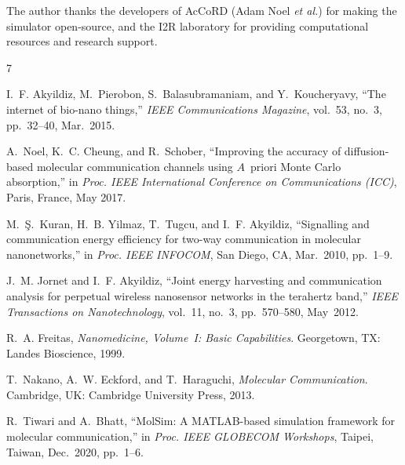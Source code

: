 \documentclass[journal]{IEEEtran}
\begin{document}
The author thanks the developers of AcCoRD (Adam Noel \emph{et al.}) for
making the simulator open-source, and the I2R laboratory for providing
computational resources and research support.

\ifCLASSOPTIONcaptionsoff
  \newpage
\fi

\begin{thebibliography}{7}

I.~F. Akyildiz, M.~Pierobon, S.~Balasubramaniam, and Y.~Koucheryavy,
``The internet of bio-nano things,''
\emph{IEEE Communications Magazine}, vol.~53, no.~3, pp.~32--40, Mar.~2015.

A.~Noel, K.~C. Cheung, and R.~Schober,
``Improving the accuracy of diffusion-based molecular communication channels
using ${A}$~priori Monte Carlo absorption,''
in \emph{Proc. IEEE International Conference on Communications (ICC)}, Paris,
France, May 2017.

M.~\c{S}.~Kuran, H.~B. Yilmaz, T.~Tugcu, and I.~F. Akyildiz,
``Signalling and communication energy efficiency for two-way communication in
molecular nanonetworks,''
in \emph{Proc. IEEE INFOCOM}, San Diego, CA, Mar.~2010, pp.~1--9.

J.~M. Jornet and I.~F. Akyildiz,
``Joint energy harvesting and communication analysis for perpetual wireless
nanosensor networks in the terahertz band,''
\emph{IEEE Transactions on Nanotechnology}, vol.~11, no.~3, pp.~570--580,
May~2012.

R.~A. Freitas,
\emph{Nanomedicine, Volume~I: Basic Capabilities}.
Georgetown, TX: Landes Bioscience, 1999.

T.~Nakano, A.~W. Eckford, and T.~Haraguchi,
\emph{Molecular Communication}.
Cambridge, UK: Cambridge University Press, 2013.

R.~Tiwari and A.~Bhatt,
``MolSim: A MATLAB-based simulation framework for molecular communication,''
in \emph{Proc. IEEE GLOBECOM Workshops}, Taipei, Taiwan, Dec.~2020, pp.~1--6.

\end{thebibliography}
\end{document}

